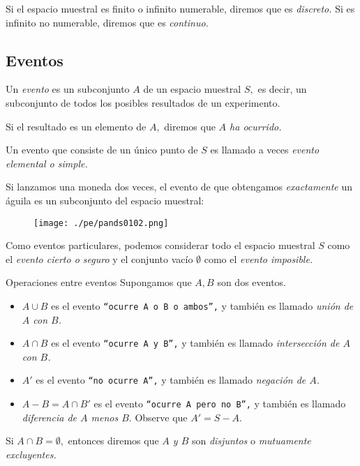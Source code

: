 {}
Si el espacio muestral es finito o infinito numerable, diremos que es \emph{discreto.}  Si es infinito no numerable, diremos que es \emph{continuo.}

\subsection{Eventos}
{}
Un \emph{evento} es un subconjunto $A$ de un espacio muestral $S,$ es decir, un subconjunto de todos los posibles resultados de un experimento. 

Si el resultado es un elemento de $A,$ diremos que \emph{$A$ ha ocurrido.} 

Un evento que consiste de un único punto de $S$ es llamado a veces \emph{evento elemental o simple.}

{}
\begin{exmp}
 \label{exmp:1.8}
 Si lanzamos una moneda dos veces, el evento de que obtengamos \emph{exactamente} un águila  es un subconjunto del espacio muestral:
 
 \begin{figure}[h]
 \centering
 \texttt{[image: ./pe/pands0102.png]}
 \label{pands0102}
\end{figure}

\end{exmp}


{}
Como eventos particulares, podemos considerar todo el espacio muestral $S$ como el \emph{evento cierto o seguro} y el conjunto vacío $\emptyset$ como el \emph{evento imposible.}


{Operaciones entre eventos} Supongamos que $A,B$ son dos eventos. 
\begin{itemize}
 \item $A\cup B$ es el evento \texttt{``ocurre $A$ o $B$ o ambos'',} y también es llamado \emph{unión de $A$ con $B$.}  
 \item $A\cap B$ es el evento \texttt{``ocurre $A$ y $B$'',} y también es llamado \emph{intersección de $A$ con $B$.}  
 \item $A'$ es el evento \texttt{``no ocurre $A$'',} y también es llamado \emph{negación de $A$.} 
 \item $A-B=A\cap B'$ es el evento \texttt{``ocurre $A$ pero no $B$'',} y también es llamado \emph{diferencia de $A$ menos $B.$}  Observe que
 $A' = S - A.$
\end{itemize}

{}
 Si $A\cap B= \emptyset,$ entonces diremos que \emph{$A$ y $B$} son \emph{disjuntos} o \emph{mutuamente excluyentes.} 


